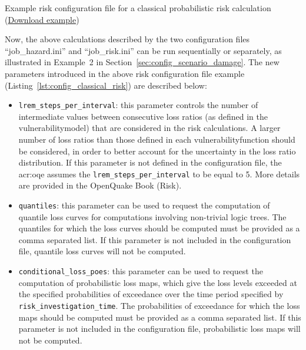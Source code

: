 \begin{listing}[htbp]
  \inputminted[firstline=1,firstnumber=1,fontsize=\footnotesize,frame=single,linenos,bgcolor=lightgray,label=job\_risk.ini]{ini}{oqum/risk/verbatim/config_classical_risk.ini}
  \caption{Example risk configuration file for a classical probabilistic risk calculation (\href{https://raw.githubusercontent.com/gem/oq-engine/master/doc/manual/oqum/risk/verbatim/config_classical_risk.ini}{Download example})}
  \label{lst:config_classical_risk}
\end{listing}

Now, the above calculations described by the two configuration files
``job\_hazard.ini'' and ``job\_risk.ini'' can be run sequentially or
separately, as illustrated in Example~2 in
Section~\ref{sec:config_scenario_damage}. The new parameters introduced in the
above risk configuration file example
(Listing~\ref{lst:config_classical_risk}) are described below:

\begin{itemize}

	\item \Verb+lrem_steps_per_interval+: this parameter controls the number of
	  intermediate values between consecutive loss ratios (as defined in the 
	  \gls{vulnerabilitymodel}) that are considered in the risk calculations.
	  A larger number of loss ratios than those defined in each
	  \gls{vulnerabilityfunction} should be considered, in order to better
	  account for the uncertainty in the loss ratio distribution. If this
	  parameter is not defined in the configuration file, the \glsdesc{acr:oqe}
	  assumes the \Verb+lrem_steps_per_interval+ to be equal to 5. More details
	  are provided in the OpenQuake Book (Risk).

	\item \Verb+quantiles+: this parameter can be used to request
	  the computation of quantile loss curves for computations involving
	  non-trivial logic trees. The quantiles for which the loss curves should
	  be computed must be provided as a comma separated list. If this parameter
	  is not included in the configuration file, quantile loss curves will not
	  be computed. 

	\item \Verb+conditional_loss_poes+: this parameter can be used to request
	  the computation of probabilistic loss maps, which give the loss levels
	  exceeded at the specified probabilities of exceedance over the time
	  period specified by \Verb+risk_investigation_time+. The probabilities of
	  exceedance for which the loss maps should be computed must be provided as
	  a comma separated list. If this parameter is not included in the
	  configuration file, probabilistic loss maps will not be computed.

\end{itemize}
